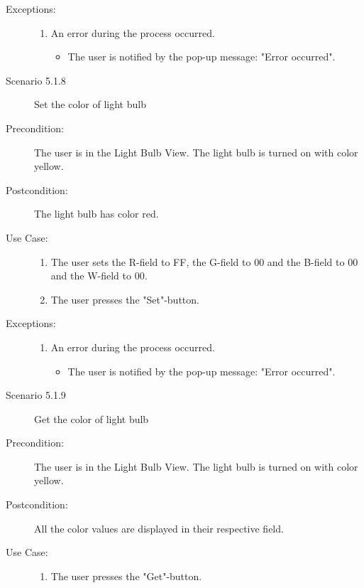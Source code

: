 \documentclass[a4paper]{article}
\begin{document}
\begin{description}
\item[Exceptions:]
\item[]
\begin{enumerate}
\item An error during the process occurred.
\begin{itemize}
\item The user is notified by the pop-up message: "Error occurred".
\end{itemize}
\end{enumerate}

\item[]

\item[Scenario 5.1.8] Set the color of light bulb
\item[Precondition:] The user is in the Light Bulb View. The light bulb is turned on with color yellow.
\item[Postcondition:] The light bulb has color red.
\item[Use Case:]\mbox{}
\begin{enumerate}
\item  \label{4} The user sets the R-field to FF, the G-field to 00 and the B-field to 00 and the W-field to 00.
\item The user presses the "Set"-button.

\end{enumerate}

\item[Exceptions:]
\item[]
\begin{enumerate}
\item An error during the process occurred.
\begin{itemize}
\item The user is notified by the pop-up message: "Error occurred".
\end{itemize}
\end{enumerate}

\item[]

\item[Scenario 5.1.9] Get the color of light bulb
\item[Precondition:] The user is in the Light Bulb View. The light bulb is turned on with color yellow.
\item[Postcondition:] All the color values are displayed in their respective field.
\item[Use Case:]\mbox{}
\begin{enumerate}
\item  \label{4} The user presses the "Get"-button.
\end{enumerate}


\end{description}
\end{document}
